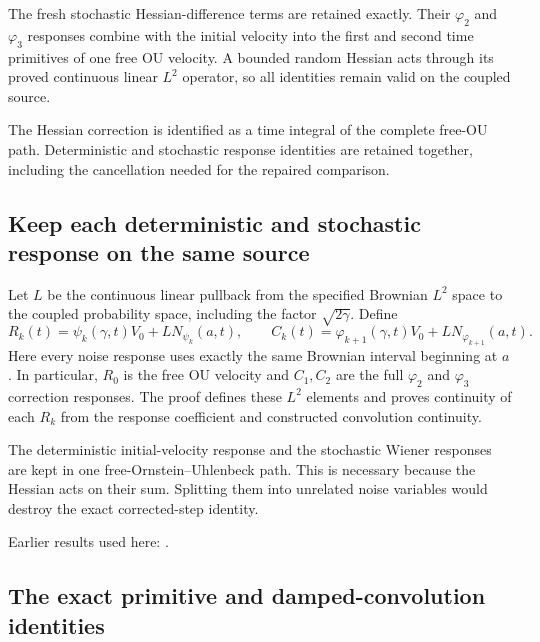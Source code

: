 \documentclass[11pt,a4paper]{report}
\begin{document}
The fresh stochastic Hessian-difference terms are retained exactly. Their \(\varphi _{2}\) and \(\varphi _{3}\) responses combine with the initial velocity into the first and second time primitives of one free OU velocity. A bounded random Hessian acts through its proved continuous linear \(L^{2}\) operator, so all identities remain valid on the coupled source.



The Hessian correction is identified as a time integral of the complete free-OU path. Deterministic and stochastic response identities are retained together, including the cancellation needed for the repaired comparison.

\subsection{\texorpdfstring{Keep each deterministic and stochastic response on the same source}{Keep each deterministic and stochastic response on the same source}}
\label{report-step-KineticLangevin-FreeOUCorrection-lean-1}


Let \(L\) be the continuous linear pullback from the specified Brownian \(L^{2}\) space to the coupled probability space, including the factor \(\sqrt{2\gamma}\). Define \[R_k(t)=\psi_k(\gamma,t)V_0+L N_{\psi_k}(a,t),\qquad C_k(t)=\varphi_{k+1}(\gamma,t)V_0+L N_{\varphi_{k+1}}(a,t).\] Here every noise response uses exactly the same Brownian interval beginning at \(a\). In particular, \(R_0\) is the free OU velocity and \(C_1,C_2\) are the full \(\varphi _{2}\) and \(\varphi _{3}\) correction responses. The proof defines these \(L^{2}\) elements and proves continuity of each \(R_k\) from the response coefficient and constructed convolution continuity.



The deterministic initial-velocity response and the stochastic Wiener responses are kept in one free-Ornstein–Uhlenbeck path. This is necessary because the Hessian acts on their sum. Splitting them into unrelated noise variables would destroy the exact corrected-step identity.



Earlier results used here: \cite[Section~3.8.17]{LangevinLean2026ULASC}.
\subsection{\texorpdfstring{The exact primitive and damped-convolution identities}{The exact primitive and damped-convolution identities}}
\label{report-step-KineticLangevin-FreeOUCorrection-lean-2}
\end{document}
